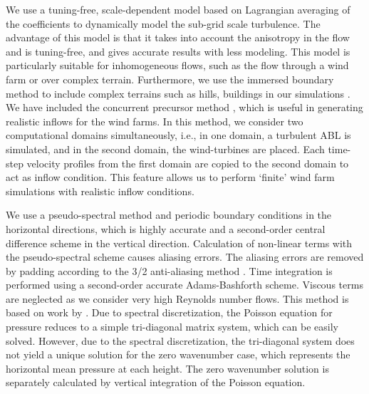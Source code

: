 \documentclass[output=paper,colorlinks,citecolor=brown]{langscibook}
\begin{document}
We use a tuning-free, scale-dependent model based on Lagrangian averaging of the coefficients \citep{bou05, sto06, sto08} to dynamically model the sub-grid scale turbulence. The advantage of this model is that it takes into account the anisotropy in the flow and is tuning-free, and gives accurate results with less modeling. This model is particularly suitable for inhomogeneous flows, such as the flow through a wind farm or over complex terrain. Furthermore, we use the immersed boundary method to include complex terrains such as hills, buildings in our simulations \citep{liu20}.\\

We have included the concurrent precursor method \citep{ste14}, which is useful in generating realistic inflows for the wind farms. In this method, we consider two computational domains simultaneously, i.e., in one domain, a turbulent ABL is simulated, and in the second domain, the wind-turbines are placed. Each time-step velocity profiles from the first domain are copied to the second domain to act as inflow condition. This feature allows us to perform `finite' wind farm simulations with realistic inflow conditions.

We use a pseudo-spectral method and periodic boundary conditions in the horizontal directions, which is highly accurate and a second-order central difference scheme in the vertical direction. {\color{red}Calculation of non-linear terms with the pseudo-spectral scheme causes aliasing errors. The aliasing errors are removed by padding according to the 3/2 anti-aliasing method \citep{can88}}. Time integration is performed using a second-order accurate Adams-Bashforth scheme. Viscous terms are neglected as we consider very high Reynolds number flows. This method is based on work by \cite{alb99b}. Due to spectral discretization, the Poisson equation for pressure reduces to a simple tri-diagonal matrix system, which can be easily solved. However, due to the spectral discretization, the tri-diagonal system does not yield a unique solution for the zero wavenumber case, which represents the horizontal mean pressure at each height. The zero wavenumber solution is separately calculated by vertical integration of the Poisson equation.
\end{document}
